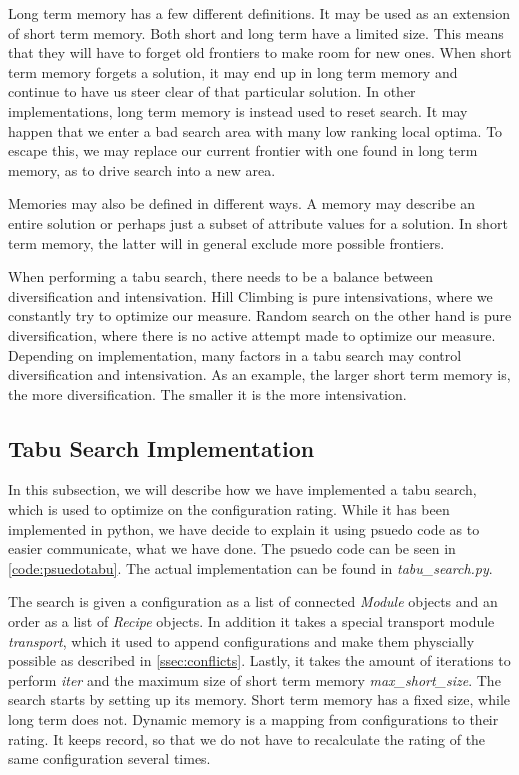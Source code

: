 Long term memory has a few different definitions. It may be used as an extension of short term memory. Both short and long term have a limited size. This means that they will have to forget old frontiers to make room for new ones. When short term memory forgets a solution, it may end up in long term memory and continue to have us steer clear of that particular solution. In other implementations, long term memory is instead used to reset search. It may happen that we enter a bad search area with many low ranking local optima. To escape this, we may replace our current frontier with one found in long term memory, as to drive search into a new area.

Memories may also be defined in different ways. A memory may describe an entire solution or perhaps just a subset of attribute values for a solution. In short term memory, the latter will in general exclude more possible frontiers. 

When performing a tabu search, there needs to be a balance between diversification and intensivation. Hill Climbing is pure intensivations, where we constantly try to optimize our measure. Random search on the other hand is pure diversification, where there is no active attempt made to optimize our measure. Depending on implementation, many factors in a tabu search may control diversification and intensivation. As an example, the larger short term memory is, the more diversification. The smaller it is the more intensivation.


\subsection{Tabu Search Implementation}
In this subsection, we will describe how we have implemented a tabu search, which is used to optimize on the configuration rating. While it has been implemented in python, we have decide to explain it using psuedo code as to easier communicate, what we have done. The psuedo code can be seen in \cref{code:psuedotabu}. The actual implementation can be found in  \textit{tabu\_search.py}. 



The search is given a configuration as a list of connected \textit{Module} objects and an order as a list of \textit{Recipe} objects. In addition it takes a special transport module \textit{transport}, which it used to append configurations and make them physcially possible as described in \cref{ssec:conflicts}. Lastly, it takes the amount of iterations to perform \textit{iter} and the maximum size of short term memory \textit{max\_short\_size}. The search starts by setting up its memory. Short term memory has a fixed size, while long term does not. Dynamic memory is a mapping from configurations to their rating. It keeps record, so that we do not have to recalculate the rating of the same configuration several times. 

